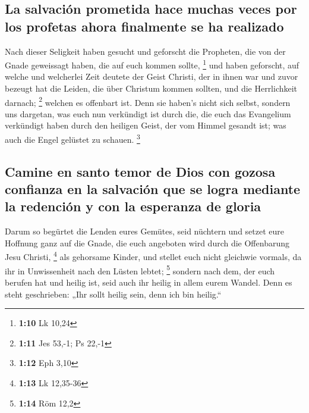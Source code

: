 \hypertarget{la-salvaciuxf3n-prometida-hace-muchas-veces-por-los-profetas-ahora-finalmente-se-ha-realizado}{%
\subsection{La salvación prometida hace muchas veces por los profetas
ahora finalmente se ha
realizado}\label{la-salvaciuxf3n-prometida-hace-muchas-veces-por-los-profetas-ahora-finalmente-se-ha-realizado}}

 Nach dieser Seligkeit haben gesucht und geforscht die
Propheten, die von der Gnade geweissagt haben, die auf euch kommen
sollte, \footnote{\textbf{1:10} Lk 10,24}  und haben
geforscht, auf welche und welcherlei Zeit deutete der Geist Christi, der
in ihnen war und zuvor bezeugt hat die Leiden, die über Christum kommen
sollten, und die Herrlichkeit darnach; \footnote{\textbf{1:11} Jes
  53,-1; Ps 22,-1}  welchen es offenbart ist. Denn sie
haben's nicht sich selbst, sondern uns dargetan, was euch nun verkündigt
ist durch die, die euch das Evangelium verkündigt haben durch den
heiligen Geist, der vom Himmel gesandt ist; was auch die Engel gelüstet
zu schauen. \footnote{\textbf{1:12} Eph 3,10}

\hypertarget{camine-en-santo-temor-de-dios-con-gozosa-confianza-en-la-salvaciuxf3n-que-se-logra-mediante-la-redenciuxf3n-y-con-la-esperanza-de-gloria}{%
\subsection{Camine en santo temor de Dios con gozosa confianza en la
salvación que se logra mediante la redención y con la esperanza de
gloria}\label{camine-en-santo-temor-de-dios-con-gozosa-confianza-en-la-salvaciuxf3n-que-se-logra-mediante-la-redenciuxf3n-y-con-la-esperanza-de-gloria}}

 Darum so begürtet die Lenden eures Gemütes, seid
nüchtern und setzet eure Hoffnung ganz auf die Gnade, die euch angeboten
wird durch die Offenbarung Jesu Christi, \footnote{\textbf{1:13} Lk
  12,35-36}  als gehorsame Kinder, und stellet euch nicht
gleichwie vormals, da ihr in Unwissenheit nach den Lüsten lebtet;
\footnote{\textbf{1:14} Röm 12,2}  sondern nach dem, der
euch berufen hat und heilig ist, seid auch ihr heilig in allem eurem
Wandel.  Denn es steht geschrieben: „Ihr sollt heilig
sein, denn ich bin heilig.``


